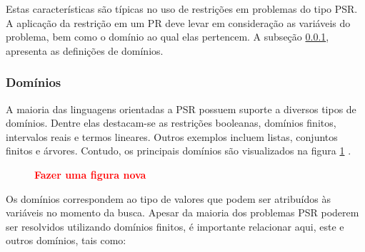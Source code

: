 Estas  características são típicas no uso de restrições em problemas do tipo PSR. A aplicação da restrição em um PR deve levar em consideração as variáveis do problema, bem como o domínio ao qual elas pertencem. A subseção \ref{sec:dominios}, apresenta as definições de domínios.

\subsubsection{Domínios}
\label{sec:dominios}

A maioria das linguagens orientadas a PSR possuem suporte a diversos tipos de domínios. Dentre elas destacam-se as restrições booleanas, domínios finitos, intervalos reais e termos lineares. Outros  exemplos incluem listas, conjuntos finitos e árvores. Contudo, os principais domínios são visualizados na figura \ref{fig:dominios} \cite{sucupira_03}.

\begin{figure}[!ht]
\begin{center}
{\bf \textcolor{red}{Fazer uma figura nova}}

\label{fig:dominios}
\end{center}
\end{figure}




Os domínios correspondem ao tipo de valores que podem ser atribuídos às variáveis no momento da busca. Apesar da maioria dos problemas PSR poderem ser resolvidos utilizando domínios finitos, é importante relacionar aqui, este e outros domínios, tais como:



